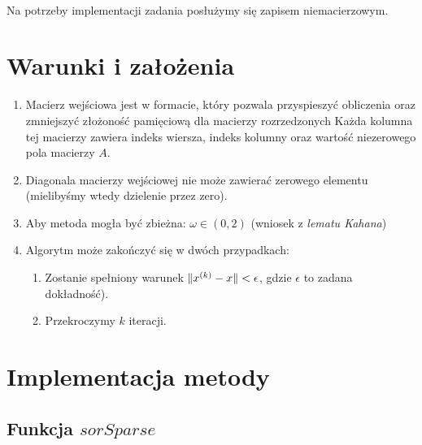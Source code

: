 \documentclass{article}
\DeclarePairedDelimiter{\norm}{\lVert}{\rVert}
\begin{document}
\paragraph{}
Na potrzeby implementacji zadania posłużymy się zapisem niemacierzowym.

\section{Warunki i założenia}
\begin{enumerate}
\item Macierz wejściowa jest w formacie, który pozwala przyspieszyć obliczenia oraz zmniejszyć złożoność pamięciową dla macierzy rozrzedzonych
 Każda kolumna tej macierzy zawiera indeks wiersza, indeks kolumny oraz wartość niezerowego pola macierzy $A$.
\item Diagonala macierzy wejściowej nie może zawierać zerowego elementu (mielibyśmy wtedy dzielenie przez zero). 
\item Aby metoda mogła być zbieżna: $\omega \in (0,2)$ (wniosek z \textit{lematu Kahana})
\item Algorytm może zakończyć się w dwóch przypadkach:
\begin {enumerate}
\item Zostanie spełniony warunek $\norm{x^{(k)}-x}<\epsilon$, gdzie $\epsilon$ to zadana\\ dokładność).
\item Przekroczymy $k$ iteracji.
\end {enumerate}
\end{enumerate}

\section{Implementacja metody}
\subsection{Funkcja $sorSparse$}
\end{document}
